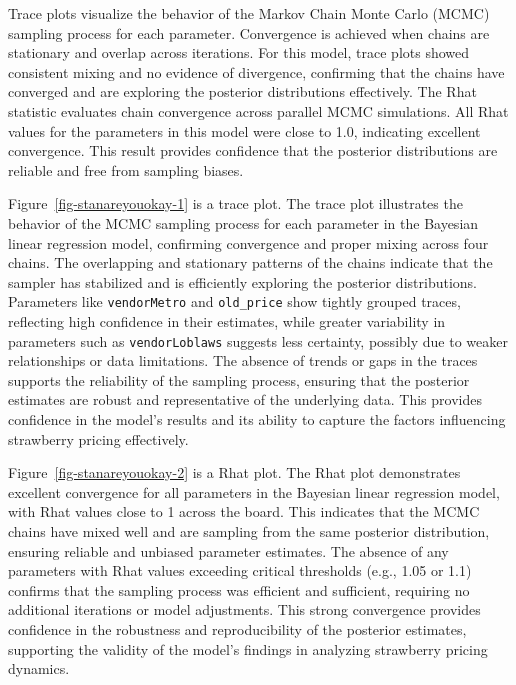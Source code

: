 \documentclass[
  letterpaper,
  DIV=11,
  numbers=noendperiod]{scrartcl}
\begin{document}
Trace plots visualize the behavior of the Markov Chain Monte Carlo
(MCMC) sampling process for each parameter. Convergence is achieved when
chains are stationary and overlap across iterations. For this model,
trace plots showed consistent mixing and no evidence of divergence,
confirming that the chains have converged and are exploring the
posterior distributions effectively. The Rhat statistic evaluates chain
convergence across parallel MCMC simulations. All Rhat values for the
parameters in this model were close to 1.0, indicating excellent
convergence. This result provides confidence that the posterior
distributions are reliable and free from sampling biases.

Figure~\ref{fig-stanareyouokay-1} is a trace plot. The trace plot
illustrates the behavior of the MCMC sampling process for each parameter
in the Bayesian linear regression model, confirming convergence and
proper mixing across four chains. The overlapping and stationary
patterns of the chains indicate that the sampler has stabilized and is
efficiently exploring the posterior distributions. Parameters like
\texttt{vendorMetro} and \texttt{old\_price} show tightly grouped
traces, reflecting high confidence in their estimates, while greater
variability in parameters such as \texttt{vendorLoblaws} suggests less
certainty, possibly due to weaker relationships or data limitations. The
absence of trends or gaps in the traces supports the reliability of the
sampling process, ensuring that the posterior estimates are robust and
representative of the underlying data. This provides confidence in the
model's results and its ability to capture the factors influencing
strawberry pricing effectively.

Figure~\ref{fig-stanareyouokay-2} is a Rhat plot. The Rhat plot
demonstrates excellent convergence for all parameters in the Bayesian
linear regression model, with Rhat values close to 1 across the board.
This indicates that the MCMC chains have mixed well and are sampling
from the same posterior distribution, ensuring reliable and unbiased
parameter estimates. The absence of any parameters with Rhat values
exceeding critical thresholds (e.g., 1.05 or 1.1) confirms that the
sampling process was efficient and sufficient, requiring no additional
iterations or model adjustments. This strong convergence provides
confidence in the robustness and reproducibility of the posterior
estimates, supporting the validity of the model's findings in analyzing
strawberry pricing dynamics.
\end{document}

